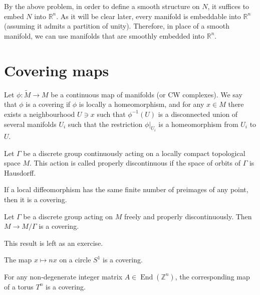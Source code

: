 \medskip\noindent
By the above problem, in order to define a
smooth structure on $N$, it suffices to
embed $N$ into $\mathbb{R}^n$. As it will be
clear later, every manifold is embeddable
into $\mathbb{R}^n$ (assuming it admits a
partition of unity). Therefore, in place of
a smooth manifold, we can use manifolds
that are smoothly embedded into
$\mathbb{R}^n$.

\section{Covering maps}
\label{section-covering-maps}

\begin{definition}
\label{definition-covering-map}
Let $\phi:\tilde{M}\to M$ be a continuous
map of manifolds (or CW complexes). We say
that $\phi$ is a covering if $\phi$ is
locally a homeomorphism, and for any
$x \in M$ there exists a neighbourhood
$U \ni x$ such that $\phi^{-1}(U)$ is a
disconnected union of several manifolds
$U_i$ such that the restriction
$\phi|_{U_i}$ is a homeomorphism from
$U_i$ to $U$.
\end{definition}

\begin{definition}
\label{definition-properly-discontinuous}
Let $\Gamma$ be a discrete group
continuously acting on a locally compact
topological space $M$. This action is called
properly discontinuous if the space of
orbits of $\Gamma$ is Hausdorff.
\end{definition}

\begin{lemma}
\label{lemma-local-diffeomorphism-finite-fibers-covering}
If a local diffeomorphism has the same
finite number of preimages of any point,
then it is a covering.
\end{lemma}

\begin{theorem}
\label{theorem-properly-discontinuous-covering}
Let $\Gamma$ be a discrete group acting on
$M$ freely and properly discontinuously.
Then $M \to M/\Gamma$ is a covering.
\end{theorem}

\medskip\noindent
This result is left as an exercise.

\medskip\noindent
\begin{example}
\label{example-circle-covering}
The map $x \mapsto nx$ on a circle $S^1$ is
a covering.
\end{example}

\begin{example}
\label{example-torus-covering}
For any non-degenerate integer matrix
$A \in \operatorname{End}(\mathbb{Z}^n)$,
the corresponding map of a torus $T^n$ is a
covering.
\end{example}

